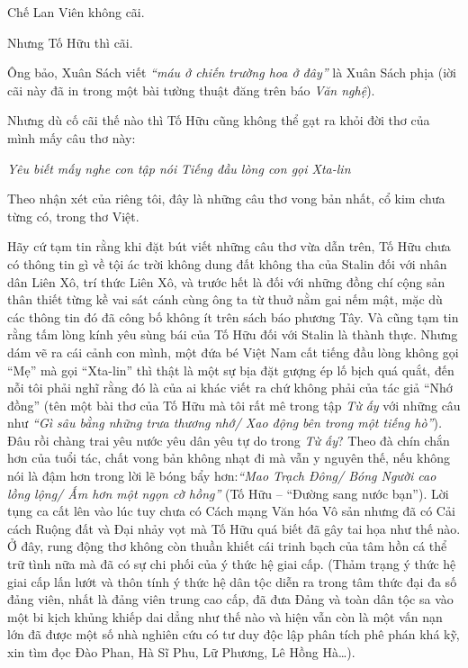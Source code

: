 \documentclass[../main.tex]{subfiles}
\begin{document}
\begin{multicols}{2}
Chế Lan Viên không cãi. 
 
Nhưng Tố Hữu thì cãi. 
 
Ông bảo, Xuân Sách viết \textit{“máu ở chiến} \textit{trường hoa ở đây”} là Xuân Sách phịa (iời cãi này đã in trong một bài tường thuật đăng trên báo \textit{Văn nghệ}).  
  
Nhưng dù cố cãi thế nào thì Tố Hữu cũng không thể gạt ra khỏi đời thơ của mình mấy câu thơ này: 
\begin{blockquote}
        
\textit{Yêu biết mấy nghe con tập nói} 
\textit{Tiếng đầu lòng con gọi Xta-lin} 

\end{blockquote}
 
Theo nhận xét của riêng tôi, đây là những câu thơ vong bản nhất, cổ kim chưa từng có, trong thơ Việt. 
 
Hãy cứ tạm tin rằng khi đặt bút viết những câu thơ vừa dẫn trên, Tố Hữu chưa có thông tin gì về tội ác trời không dung đất không tha của Stalin đối với nhân dân Liên Xô, trí thức Liên Xô, và trước hết là đối với những đồng chí cộng sản thân thiết từng kề vai sát cánh cùng ông ta từ thuở nằm gai nếm mật, mặc dù các thông tin đó đã công bố không ít trên sách báo phương Tây. Và cũng tạm tin rằng tấm lòng kính yêu sùng bái của Tố Hữu đối với Stalin là thành thực. Nhưng dám vẽ ra cái cảnh con mình, một đứa bé Việt Nam cất tiếng đầu lòng không gọi “Mẹ” mà gọi “Xta-lin” thì thật là một sự bịa đặt gượng ép lố bịch quá quắt, đến nỗi tôi phải nghĩ rằng đó là của ai khác viết ra chứ không phải của tác giả “Nhớ đồng” (tên một bài thơ của Tố Hữu mà tôi rất mê trong tập \textit{Từ ấy} với những câu như \textit{“Gì sâu bằng những trưa thương nhớ/ Xao động} \textit{bên trong một tiếng hò”})\textit{. }Đâu rồi chàng trai yêu nước yêu dân yêu tự do trong \textit{Từ ấy}? Theo đà chín chắn hơn của tuổi tác, chất vong bản không nhạt đi mà vẫn y nguyên thế, nếu không nói là đậm hơn trong lời lẽ bóng bẩy hơn:\textit{“Mao Trạch Đông/ Bóng Người cao lồng lộng/ Ấm hơn một ngọn cờ hồng” }(Tố Hữu – “Đường sang nước bạn”). Lời tụng ca cất lên vào lúc tuy chưa có Cách mạng Văn hóa Vô sản nhưng đã có Cải cách Ruộng đất và Đại nhảy vọt mà Tố Hữu quá biết đã gây tai họa như thế nào. Ở đây, rung động thơ không còn thuần khiết cái trinh bạch của tâm hồn cá thể trữ tình nữa mà đã có sự chi phối của ý thức hệ giai cấp. (Thảm trạng ý thức hệ giai cấp lấn lướt và thôn tính ý thức hệ dân tộc diễn ra trong tâm thức đại đa số đảng viên, nhất là đảng viên trung cao cấp, đã đưa Đảng và toàn dân tộc sa vào một bi kịch khủng khiếp dai dẳng như thế nào và hiện vẫn còn là một vấn nạn lớn đã được một số nhà nghiên cứu có tư duy độc lập phân tích phê phán khá kỹ, xin tìm đọc Đào Phan, Hà Sĩ Phu, Lữ Phương, Lê Hồng Hà…). 
 

\end{multicols}
\end{document}
